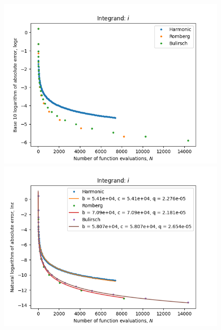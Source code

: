 \begin{figure}[H]
\centering
\begin{minipage}{0.45\textwidth}
\centering
\includegraphics[scale=0.45]{romberg_plots/circle_area_hp.png}
\end{minipage}
\begin{minipage}{0.45\textwidth}
\centering
\includegraphics[scale=0.45]{romberg_plots/circle_area_hp_trend.png}
\end{minipage}
\end{figure}


